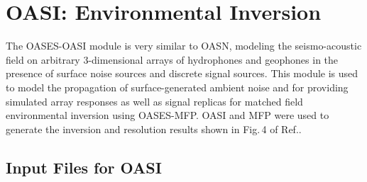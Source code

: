 \section{OASI: Environmental Inversion}

The OASES-OASI module is very similar to OASN, modeling the seismo-acoustic field on arbitrary
3-dimensional arrays of hydrophones and geophones in the presence of
surface noise sources and discrete signal sources. This module is used
to model the propagation of surface-generated ambient noise and for
providing simulated array responses as well as signal replicas for
matched field environmental inversion using  OASES-MFP. OASI and MFP
were used to generate the inversion and resolution results shown in
 Fig.\,4 of Ref.\cite{Saclant94}. 

\subsection{Input Files for OASI}

